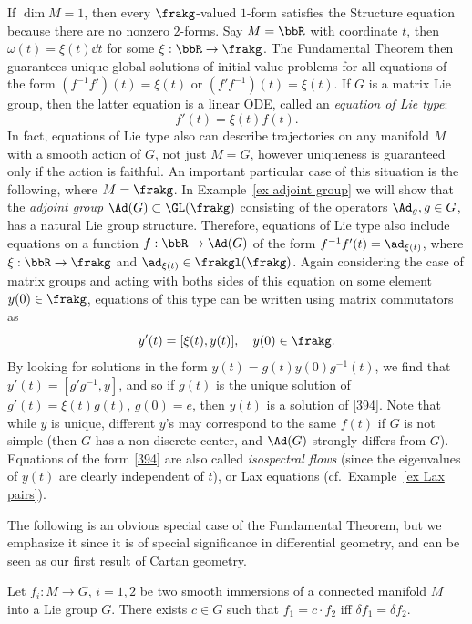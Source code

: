 \begin{example}
    If $\dim M=1$, then every $\frakg$-valued $1$-form satisfies the Structure equation because there are no nonzero $2$-forms. Say $M=\bbR$ with coordinate $t$, then $\omega(t)=\xi(t)\dd t$ for some $\xi:\bbR\to \frakg$. The Fundamental Theorem then guarantees unique global solutions of initial value problems for all equations of the form $(f^{-1}f')(t)=\xi(t)$ or $(f'f^{-1})(t)=\xi(t)$. If $G$ is a matrix Lie group, then the latter equation is a linear ODE, called an \emph{equation of Lie type}:
    \[f'(t)=\xi(t)f(t).\]
    In fact, equations of Lie type also can describe trajectories on any manifold $M$ with a smooth action of $G$, not just $M=G$, however uniqueness is guaranteed only if the action is faithful. An important particular case of this situation is the following, where $M=\frakg$. In Example~\ref{ex adjoint group} we will show that the \emph{adjoint group} $\Ad(G)\subset \GL(\frakg)$ consisting of the operators $\Ad_g,g\in G$, has a natural Lie group structure. Therefore, equations of Lie type also include equations on a function $f:\bbR\to \Ad(G)$ of the form $f^{-1}f'(t)=\ad_{\xi(t)}$, where $\xi:\bbR\to \frakg$ and $\ad_{\xi(t)}\in \frakgl(\frakg)$. Again considering the case of matrix groups and acting with boths sides of this equation on some element $y(0)\in \frakg$, equations of this type can be written using matrix commutators as 
    \[y'(t)=[\xi(t),y(t)],\quad y(0)\in\frakg.\label{394}\]
    By looking for solutions in the form $y(t)=g(t)y(0)g^{-1}(t)$, we find that $y'(t)=[g'g^{-1},y]$, and so if $g(t)$ is the unique solution of $g'(t)=\xi(t)g(t)$, $g(0)=e$, then $y(t)$ is a solution of \eqref{394}. Note that while $y$ is unique, different $y$'s may correspond to the same $f(t)$ if $G$ is not simple (then $G$ has a non-discrete center, and $\Ad(G)$ strongly differs from $G$). Equations of the form \eqref{394} are also called \emph{isospectral flows} (since the eigenvalues of $y(t)$ are clearly independent of $t$), or Lax equations (cf.\ Example~\ref{ex Lax pairs}).
\end{example}

The following is an obvious special case of the Fundamental Theorem, but we emphasize it since it is of special significance in differential geometry, and can be seen as our first result of Cartan geometry.

\begin{cor}\label{cor immersions into G}
    Let $f_i:M\to G$, $i=1,2$ be two smooth immersions of a connected manifold $M$ into a Lie group $G$. There exists $c\in G$ such that $f_1=c\cdot f_2$ iff $\delta f_1=\delta f_2$.
\end{cor}





